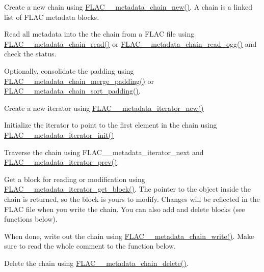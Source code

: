 \begin{DoxyItemize}
\item Create a new chain using \hyperlink{group__flac__metadata__level2_gafd1f4f58af29325b067ebc5dc34a0f69}{F\+L\+A\+C\+\_\+\+\_\+metadata\+\_\+chain\+\_\+new()}. A chain is a linked list of F\+L\+AC metadata blocks.
\item Read all metadata into the the chain from a F\+L\+AC file using \hyperlink{group__flac__metadata__level2_gadb7d8e9a82aeb43e256f0a948adf5c45}{F\+L\+A\+C\+\_\+\+\_\+metadata\+\_\+chain\+\_\+read()} or \hyperlink{group__flac__metadata__level2_gae7b34f2929bedea0e14ac14aca253a40}{F\+L\+A\+C\+\_\+\+\_\+metadata\+\_\+chain\+\_\+read\+\_\+ogg()} and check the status.
\item Optionally, consolidate the padding using \hyperlink{group__flac__metadata__level2_gab24934bc1f0e054c631a22c9b9221f3e}{F\+L\+A\+C\+\_\+\+\_\+metadata\+\_\+chain\+\_\+merge\+\_\+padding()} or \hyperlink{group__flac__metadata__level2_gaa14304da1c8e706808cfafa5cbbf575b}{F\+L\+A\+C\+\_\+\+\_\+metadata\+\_\+chain\+\_\+sort\+\_\+padding()}.
\item Create a new iterator using \hyperlink{group__flac__metadata__level2_gac988906d63bd2ddc910d8f0b118591f7}{F\+L\+A\+C\+\_\+\+\_\+metadata\+\_\+iterator\+\_\+new()}
\item Initialize the iterator to point to the first element in the chain using \hyperlink{group__flac__metadata__level2_ga4a5af69a1f19436b02f738eb8c97c959}{F\+L\+A\+C\+\_\+\+\_\+metadata\+\_\+iterator\+\_\+init()}
\item Traverse the chain using F\+L\+A\+C\+\_\+\+\_\+metadata\+\_\+iterator\+\_\+next and \hyperlink{group__flac__metadata__level2_ga003373a88bea6cea2df32f110a95e912}{F\+L\+A\+C\+\_\+\+\_\+metadata\+\_\+iterator\+\_\+prev()}.
\item Get a block for reading or modification using \hyperlink{group__flac__metadata__level2_ga4a2b00a4312d178a9f55c2e2f8b08904}{F\+L\+A\+C\+\_\+\+\_\+metadata\+\_\+iterator\+\_\+get\+\_\+block()}. The pointer to the object inside the chain is returned, so the block is yours to modify. Changes will be reflected in the F\+L\+AC file when you write the chain. You can also add and delete blocks (see functions below).
\item When done, write out the chain using \hyperlink{group__flac__metadata__level2_gaa15ead7230217de8e79f4af822cda490}{F\+L\+A\+C\+\_\+\+\_\+metadata\+\_\+chain\+\_\+write()}. Make sure to read the whole comment to the function below.
\item Delete the chain using \hyperlink{group__flac__metadata__level2_ga178898eef72ba9d569b1964fffcb4a8b}{F\+L\+A\+C\+\_\+\+\_\+metadata\+\_\+chain\+\_\+delete()}.
\end{DoxyItemize}

